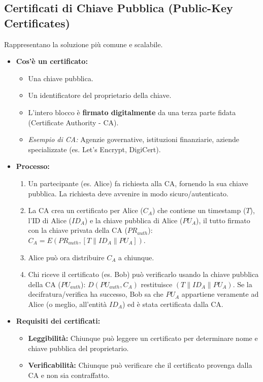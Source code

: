 \documentclass{article}
\begin{document}
\subsection{Certificati di Chiave Pubblica (Public-Key Certificates)}
Rappresentano la soluzione più comune e scalabile.
\begin{itemize}
    \item \textbf{Cos'è un certificato:}
        \begin{itemize}
            \item Una chiave pubblica.
            \item Un identificatore del proprietario della chiave.
            \item L'intero blocco è \textbf{firmato digitalmente} da una terza parte fidata (Certificate Authority - CA).
            \item \textit{Esempio di CA:} Agenzie governative, istituzioni finanziarie, aziende specializzate (es. Let's Encrypt, DigiCert).
        \end{itemize}
    \item \textbf{Processo:}
        \begin{enumerate}
            \item Un partecipante (es. Alice) fa richiesta alla CA, fornendo la sua chiave pubblica. La richiesta deve avvenire in modo sicuro/autenticato.
            \item La CA crea un certificato per Alice ($C_A$) che contiene un timestamp ($T$), l'ID di Alice ($ID_A$) e la chiave pubblica di Alice ($PU_A$), il tutto firmato con la chiave privata della CA ($PR_{auth}$): $C_A = E(PR_{auth}, [T \parallel ID_A \parallel PU_A])$.
            \item Alice può ora distribuire $C_A$ a chiunque.
            \item Chi riceve il certificato (es. Bob) può verificarlo usando la chiave pubblica della CA ($PU_{auth}$): $D(PU_{auth}, C_A)$ restituisce $(T \parallel ID_A \parallel PU_A)$. Se la decifratura/verifica ha successo, Bob sa che $PU_A$ appartiene veramente ad Alice (o meglio, all'entità $ID_A$) ed è stata certificata dalla CA.
        \end{enumerate}
    \item \textbf{Requisiti dei certificati:}
        \begin{itemize}
            \item \textbf{Leggibilità:} Chiunque può leggere un certificato per determinare nome e chiave pubblica del proprietario.
            \item \textbf{Verificabilità:} Chiunque può verificare che il certificato provenga dalla CA e non sia contraffatto.

\end{itemize}
\end{itemize}
\end{document}
